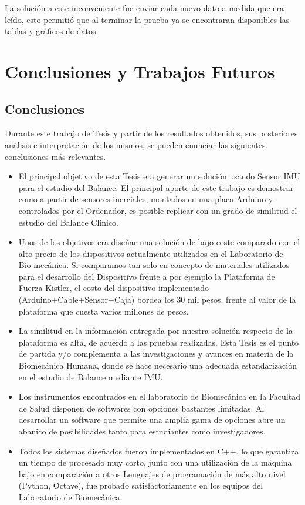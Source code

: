 \documentclass[12pt,a4paper]{article}
\begin{document}
La solución a este inconveniente fue enviar cada nuevo dato a medida que era leído, esto permitió que al terminar la prueba ya se encontraran disponibles las tablas y gráficos de datos.

\section{Conclusiones y Trabajos Futuros}
\subsection{Conclusiones}
Durante este trabajo de Tesis y partir de los resultados obtenidos, sus posteriores análisis e interpretación de los mismos, se pueden enunciar las siguientes conclusiones más relevantes.
\begin{itemize}
	\item El principal objetivo de esta Tesis era generar un solución usando Sensor IMU para el estudio del Balance. El principal aporte de este trabajo es demostrar como a partir de sensores inerciales, montados en una placa Arduino y controlados por el Ordenador, es posible replicar con un grado de similitud el estudio del Balance Clínico.
	
	\item Unos de los objetivos era diseñar una solución de bajo coste comparado con el alto precio de los dispositivos actualmente utilizados en el Laboratorio de Bio-mecánica. Si comparamos tan solo en concepto de materiales utilizados para el desarrollo del Dispositivo frente a por ejemplo la Plataforma de Fuerza Kistler, el costo del dispositivo implementado (Arduino+Cable+Sensor+Caja) bordea los 30 mil pesos, frente al valor de la plataforma que cuesta varios millones de pesos.
			
	\item La similitud en la información entregada por nuestra solución respecto de la plataforma es alta, de acuerdo a las pruebas realizadas. Esta Tesis es el punto de partida y/o complementa a las investigaciones y avances en materia de la Biomecánica Humana, donde se hace necesario una adecuada estandarización en el estudio de Balance mediante IMU.
	
	\item Los instrumentos encontrados en el laboratorio de Biomecánica en la Facultad de Salud disponen de softwares con opciones bastantes limitadas. Al desarrollar un software que permite una amplia gama de opciones abre un abanico de posibilidades tanto para estudiantes como investigadores.
	
	\item Todos los sistemas diseñados fueron implementados en C++, lo que garantiza un tiempo de procesado muy corto, junto con una utilización de la máquina bajo en comparación a otros Lenguajes de programación de más alto nivel (Python, Octave), fue probado satisfactoriamente en los equipos del Laboratorio de Biomecánica.
\end{itemize} 
\end{document}
